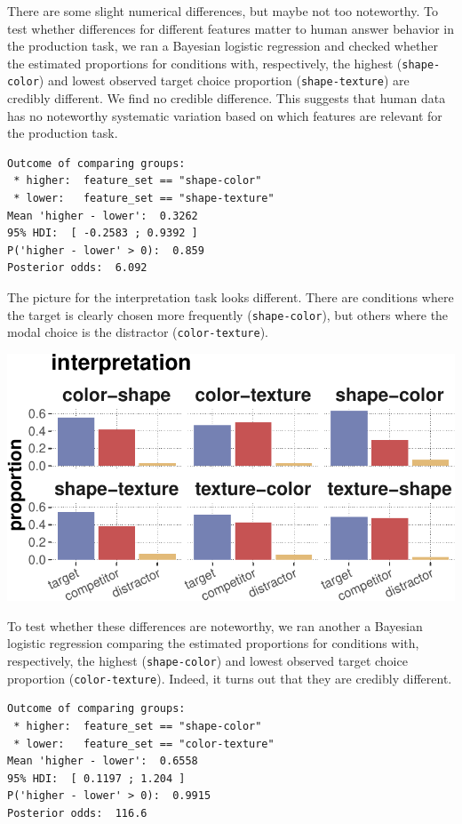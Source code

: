 \documentclass{article}
\begin{document}
There are some slight numerical differences, but maybe not too
noteworthy. To test whether differences for different features matter to
human answer behavior in the production task, we ran a Bayesian logistic
regression and checked whether the estimated proportions for conditions
with, respectively, the highest (\texttt{shape-color}) and lowest
observed target choice proportion (\texttt{shape-texture}) are credibly
different. We find no credible difference. This suggests that human data
has no noteworthy systematic variation based on which features are
relevant for the production task.

\begin{verbatim}
Outcome of comparing groups:
 * higher:  feature_set == "shape-color"
 * lower:   feature_set == "shape-texture"
Mean 'higher - lower':  0.3262
95% HDI:  [ -0.2583 ; 0.9392 ]
P('higher - lower' > 0):  0.859
Posterior odds:  6.092
\end{verbatim}

The picture for the interpretation task looks different. There are
conditions where the target is clearly chosen more frequently
(\texttt{shape-color}), but others where the modal choice is the
distractor (\texttt{color-texture}).

\includegraphics{00-pics/human-data-counts-per-featureSet-interpretation-1.pdf}

To test whether these differences are noteworthy, we ran another a
Bayesian logistic regression comparing the estimated proportions for
conditions with, respectively, the highest (\texttt{shape-color}) and
lowest observed target choice proportion (\texttt{color-texture}).
Indeed, it turns out that they are credibly different.

\begin{verbatim}
Outcome of comparing groups:
 * higher:  feature_set == "shape-color"
 * lower:   feature_set == "color-texture"
Mean 'higher - lower':  0.6558
95% HDI:  [ 0.1197 ; 1.204 ]
P('higher - lower' > 0):  0.9915
Posterior odds:  116.6
\end{verbatim}
\end{document}
